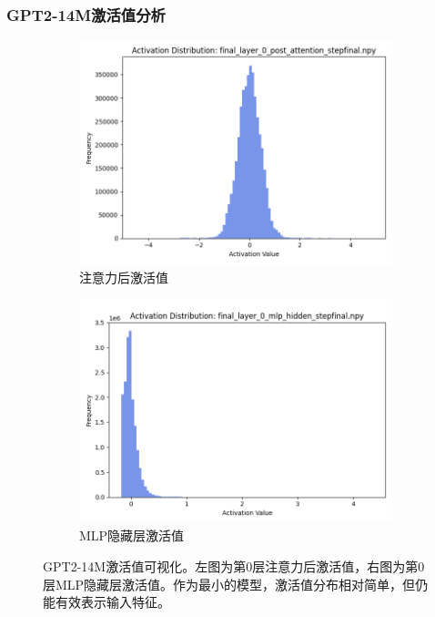 \documentclass{article}
\begin{document}
\vspace{0.5cm}

\subsubsection{GPT2-14M激活值分析}
\begin{figure}[H]
\centering
\begin{subfigure}[b]{0.45\textwidth}
\includegraphics[width=\textwidth]{../visualize/activations/GPT2-14M/final_layer_0_post_attention_stepfinal.png}
\caption{注意力后激活值}
\label{fig:act_14m_l0_post}
\end{subfigure}
\hfill
\begin{subfigure}[b]{0.45\textwidth}
\includegraphics[width=\textwidth]{../visualize/activations/GPT2-14M/final_layer_0_mlp_hidden_stepfinal.png}
\caption{MLP隐藏层激活值}
\label{fig:act_14m_l0_mlp}
\end{subfigure}
\caption{GPT2-14M激活值可视化。左图为第0层注意力后激活值，右图为第0层MLP隐藏层激活值。作为最小的模型，激活值分布相对简单，但仍能有效表示输入特征。}
\label{fig:act_14m_comparison}
\end{figure}
\end{document}
